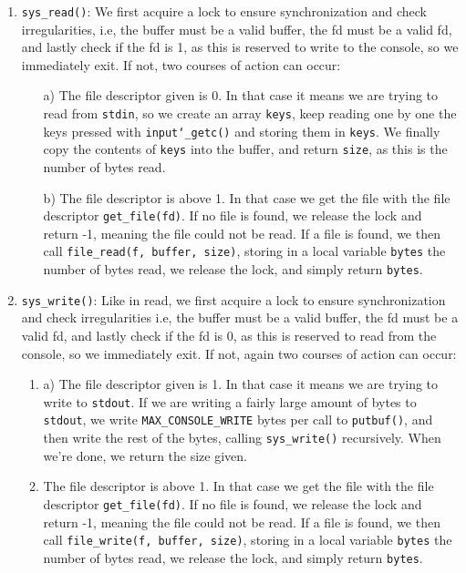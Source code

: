 \documentclass{article}
\renewcommand{\_}{\char`_}
\begin{document}
\begin{enumerate}
\item \lstinline{sys_read()}: We first acquire a lock to ensure synchronization and check irregularities, i.e, the buffer must be a valid buffer, the fd must be a valid fd, and lastly check if the fd is 1, as this is reserved to write to the console, so we immediately exit. If not, two courses of action can occur: 
\begin{enumerate}
\item[a)] The file descriptor given is 0. In that case it means we are trying to read from \texttt{stdin}, so we create an array \texttt{keys}, keep reading one by one the keys pressed with \texttt{input\_getc()} and storing them in \texttt{keys}. We finally copy the contents of \texttt{keys} into the buffer, and return \texttt{size}, as this is the number of bytes read.
\item[b)]  The file descriptor is above 1. In that case we get the file with the file descriptor \lstinline{get_file(fd)}. If no file is found, we release the lock and return -1, meaning the file could not be read. If a file is found, we then call \lstinline{file_read(f, buffer, size)}, storing in a local variable \lstinline{bytes} the number of bytes read, we release the lock, and simply return \lstinline{bytes}.
\end{enumerate}
\item \lstinline{sys_write()}: Like in read, we first acquire a lock to ensure synchronization and check irregularities i.e, the buffer must be a valid buffer, the fd must be a valid fd, and lastly check if the fd is 0, as this is reserved to read from the console, so we immediately exit. If not, again two courses of action can occur: 
\begin{enumerate}
\item[a)] The file descriptor given is 1. In that case it means we are trying to write to \lstinline{stdout}. If we are writing a fairly large amount of bytes to \lstinline{stdout}, we write \lstinline{MAX_CONSOLE_WRITE} bytes per call to \lstinline{putbuf()}, and then write the rest of the bytes, calling \lstinline{sys_write()} recursively. When we're done, we return the size given.
\item[b)]  The file descriptor is above 1. In that case we get the file with the file descriptor \lstinline{get_file(fd)}. If no file is found, we release the lock and return -1, meaning the file could not be read. If a file is found, we then call \lstinline{file_write(f, buffer, size)}, storing in a local variable \lstinline{bytes} the number of bytes read, we release the lock, and simply return \lstinline{bytes}.
\end{enumerate}
\end{enumerate}
\end{document}
